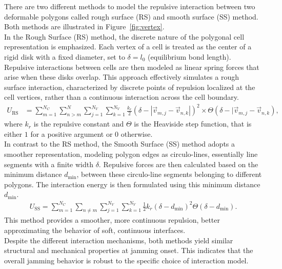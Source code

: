 There are two different methods to model the repulsive interaction between two deformable polygons called rough surface (RS) and smooth surface (SS) method.
Both methods are illustrated in Figure~\ref{fig:vertex}. \\ 
In the Rough Surface (RS) method, the discrete nature of the polygonal cell representation is emphasized. 
Each vertex of a cell is treated as the center of a rigid disk with a fixed diameter, set to $\delta = l_0$ (equilibrium bond length).
Repulsive interactions between cells are then modeled as linear spring forces that arise when these disks overlap. 
This approach effectively simulates a rough surface interaction, characterized by discrete points of repulsion localized at the cell vertices, rather than a continuous interaction across the cell boundary.
\begin{align*}
	U_{\text{RS}} &=  \sum\limits_{m=1}^{N_C} \sum\limits_{n>m}^{N} \sum\limits_{j=1}^{N_V} \sum\limits_{k=1}^{N_V} \frac{k_r}{2} (\delta - |\vec{v}_{m,j} - \vec{v}_{n,k} |)^2 \times \Theta(\delta - |\vec{v}_{m,j} - \vec{v}_{n,k}) ,
\end{align*}
where $k_r$ is the repulsive constant and $\Theta$ is the Heaviside step function, that is either $1$ for a positive argument or $0$ otherwise. \\
In contrast to the RS method, the Smooth Surface (SS) method adopts a smoother representation, modeling polygon edges as circulo-lines, essentially line segments with a finite width $\delta$. 
Repulsive forces are then calculated based on the minimum distance $d_{\text{min}}$, between these circulo-line segments belonging to different polygons. 
The interaction energy is then formulated using this minimum distance $d_{\text{min}}$.
\begin{align*}
	U_{\text{SS}} = \sum_{m=1}^{N_C} \sum_{n \neq m} \sum_{j=1}^{N_V} \sum_{k=1}^{N_V} \frac{1}{2} k_r \left( \delta - d_{\min} \right)^2 \Theta\left( \delta - d_{\min} \right).
\end{align*}
This method provides a smoother, more continuous repulsion, better approximating the behavior of soft, continuous interfaces. \\ 
Despite the different interaction mechanisms, both methods yield similar structural and mechanical properties at jamming onset. 
This indicates that the overall jamming behavior is robust to the specific choice of interaction model. \\

